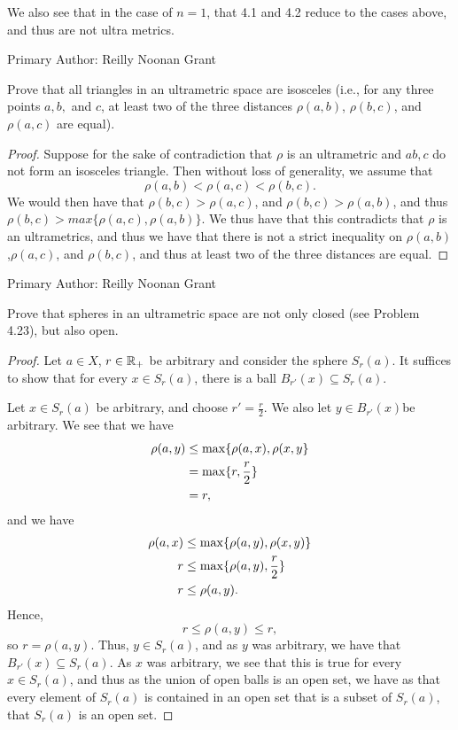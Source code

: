We also see that in the case of $n=1$, that 4.1 and 4.2 reduce to the
cases above, and thus are not ultra metrics.

Primary Author: Reilly Noonan Grant

\begin{majorEx}%
    Prove that all triangles in an ultrametric space are isosceles (i.e., for
    any three points $a,b,$ and $c$, at least two of the three distances
    $\rho(a,b)$, $\rho(b,c)$, and $\rho(a, c)$ are equal).
\end{majorEx}

\begin{proof}
    Suppose for the sake of contradiction that $\rho$ is an ultrametric and $a
    b, c$ do not form an isosceles triangle. Then without loss of
    generality, we assume that
    \[
        \rho(a,b) < \rho(a,c) < \rho(b,c).
    \]
    We would then have that 
    $\rho(b,c)>\rho(a,c) $, and $\rho(b,c)>\rho(a,b)$, and thus
    $\rho(b,c)> max\{\rho(a,c), \rho(a,b)\}$. We thus have that
    this contradicts that $\rho$ is an ultrametrics, and thus we have
    that there is not a strict inequality on $\rho(a,b)$,$\rho(a,c)$,
    and $\rho(b,c)$, and thus at least two of the three distances 
    are equal.    
\end{proof}

Primary Author: Reilly Noonan Grant

\begin{majorEx}%
    Prove that spheres in an ultrametric space are not only closed (see Problem
    4.23), but also open.
\end{majorEx}

\begin{proof}
    Let $a \in X$, $r \in \mathbb{R}_+$ be arbitrary and consider the sphere $S_r(a)$.
    It suffices to show that for every $x \in S_r(a)$, there is a ball $B_{r'}(x)
    \subseteq S_r(a)$. 

    Let $x \in S_r(a)$ be arbitrary, and choose $r' = \frac{r}{2}$. We
    also let $y\in B_{r'}(x)$be arbitrary. We see that we have
    \begin{align*}
        \rho(a, y) &\leq \max \{\rho(a, x), \rho(x, y\} \\
        &= \max \{r, \frac{r}{2}\} \\
        &= r,
    \end{align*}
    and we have
    \begin{align*}
        \rho(a, x) &\leq \max \{\rho(a, y), \rho(x, y)\} \\
        r &\leq \max \{\rho(a, y), \frac{r}{2}\} \\
        r &\leq \rho(a, y).
    \end{align*}
    Hence,
    \[
        r \leq \rho(a, y) \leq r,
    \]
    so $r = \rho(a, y)$. Thus, $y \in S_{r}(a)$, and as $y$ was
    arbitrary, we have that $B_{r'}(x) \subseteq S_r(a)$. As $x$ was
    arbitrary, we see that this is true for every $x \in S_r(a)$, and
    thus as the union of open balls is an open set, we have as that every
    element of $S_r(a)$ is contained in an open set that is a subset
    of $S_r(a)$, that $S_r(a)$ is an open set.
\end{proof}

